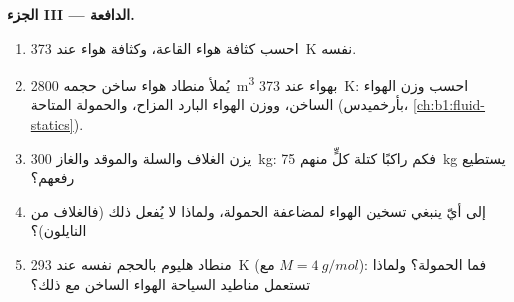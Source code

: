 \begin{problem}
\medskip
\noindent\textbf{الجزء III --- الدافعة.}
\begin{enumerate}[resume]
  \item احسب كثافة هواء القاعة، وكثافة هواء عند \qty{373}{K} 
        نفسه.
  \item يُملأ منطاد هواء ساخن حجمه \qty{2800}{m^3} بهواء عند
        \qty{373}{K}: احسب وزن الهواء الساخن، ووزن الهواء البارد
        المزاح، والحمولة المتاحة (بأرخميدس،
        \cref{ch:b1:fluid-statics}).
  \item يزن الغلاف والسلة والموقد والغاز \qty{300}{kg}: فكم راكبًا
        كتلة كلٍّ منهم \qty{75}{kg} يستطيع رفعهم؟
  \item إلى أيّ  ينبغي تسخين الهواء لمضاعفة الحمولة،
        ولماذا لا يُفعل ذلك (فالغلاف من النايلون)؟
  \item منطاد هليوم بالحجم نفسه عند \qty{293}{K}
        (مع $M = \qty{4}{g/mol}$): فما الحمولة؟ ولماذا تستعمل مناطيد
        السياحة الهواء الساخن مع ذلك؟
\end{enumerate}


\end{problem}
